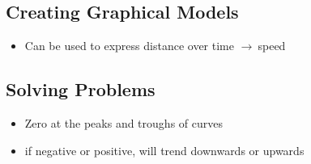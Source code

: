 \documentclass{article}
\newcommand{\rt}{$\to\ $}
\begin{document}
    \subsection{Creating Graphical Models}
    \begin{itemize}
        \item Can be used to express distance over time \rt speed
    \end{itemize}

    \subsection{Solving Problems}
    \begin{itemize}
        \item Zero at the peaks and troughs of curves
        \item if negative or positive, will trend downwards or upwards
    \end{itemize}
\end{document}

